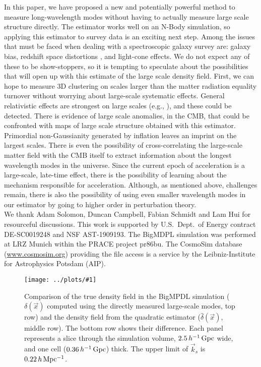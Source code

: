 \documentclass[prd,amsmath,amssymb,floatfix,superscriptaddress,nofootinbib,twocolumn]{revtex4-1}
\newcommand{\vk}{\vec{k}}
\newcommand{\sfigg}[2]{
\texttt{[image: ../plots/\#1]}
        }
\newcommand{\Sfigg}[2]{
   \begin{figure}[thbp]
    \sfigg{../plots/#1.pdf}{.8\paperwidth}
    \caption{{\small #2}}
    \label{fig:#1}
   \end{figure}
}
\begin{document}
\label{sec4}
In this paper, we have proposed a new and potentially powerful method to measure long-wavelength modes without having to actually measure large scale structure directly. The estimator works well on an N-Body simulation, so applying this estimator to survey data is an exciting next step. Among the issues that must be faced when dealing with a spectroscopic galaxy survey are: galaxy bias, redshift space distortions \cite{Kaiser:1987rsd}, and light-cone effects. We do not expect any of these to be show-stoppers, so it is tempting to speculate about the possibilities that will open up with this estimate of the large scale density field. 
First, we can hope to measure 3D clustering on scales larger than the matter radiation equality turnover without worrying about large-scale systematic effects. General relativistic effects are strongest on large scales (e.g., \cite{Jeong:2012ls}), and these could be detected. There is evidence of large scale anomalies, in the CMB, that could be confronted with maps of large scale structure obtained with this estimator. Primordial non-Gaussianity generated by inflation leaves an imprint on the largest scales. There is even the possibility of cross-correlating the large-scale matter field with the CMB itself to extract information about the longest wavelength modes in the universe. Since the current epoch of acceleration is a large-scale, late-time effect, there is the possibility of learning about the mechanism responsible for acceleration. Although, as mentioned above, challenges remain, there is also the possibility of using even smaller wavelength modes in our estimator by going to higher order in perturbation theory.\\

\noindent We thank Adam Solomon, Duncan Campbell, Fabian Schmidt and Lam Hui for resourceful discussions.  This work is supported by U.S.\ Dept.\ of Energy contract DE-SC0019248 and NSF AST-1909193.
The BigMDPL simulation was performed at LRZ Munich within the PRACE project pr86bu. The CosmoSim database (\url{www.cosmosim.org}) providing the file access is a service by the Leibniz-Institute for Astrophysics Potsdam (AIP).

\onecolumngrid
\Sfigg{real1}{Comparison of the true density field in the BigMPDL simulation ($\delta(\vec{x})$ computed using the directly measured large-scale modes, top row) and the density field from the quadratic estimator ($\hat{\delta}(\vec{x})$, middle row). The bottom row shows their difference. Each panel represents a slice through the simulation volume,  $2.5 \,h^{-1}\,\rm Gpc$ wide, and one cell ($0.36 \,h^{-1}\,\rm Gpc$) thick.  The upper limit of $\vk_s$ is $0.22 \,h\, \rm Mpc^{-1}$.}
\twocolumngrid


\end{document}
